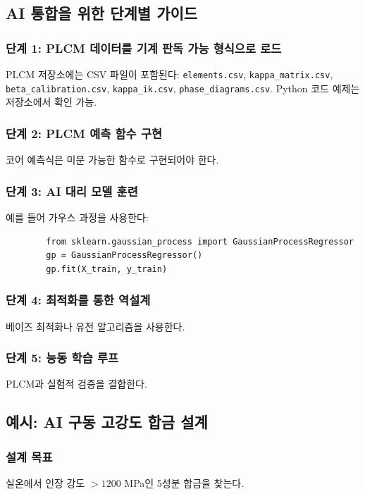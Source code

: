 \documentclass[12pt,a4paper]{article}
\begin{document}
	\subsection{AI 통합을 위한 단계별 가이드}
	
	\subsubsection{단계 1: PLCM 데이터를 기계 판독 가능 형식으로 로드}
	PLCM 저장소에는 CSV 파일이 포함된다: \texttt{elements.csv}, \texttt{kappa\_matrix.csv}, \texttt{beta\_calibration.csv}, \texttt{kappa\_ik.csv}, \texttt{phase\_diagrams.csv}. Python 코드 예제는 저장소에서 확인 가능.
	
	\subsubsection{단계 2: PLCM 예측 함수 구현}
	코어 예측식은 미분 가능한 함수로 구현되어야 한다.
	
	\subsubsection{단계 3: AI 대리 모델 훈련}
	예를 들어 가우스 과정을 사용한다:
	\begin{verbatim}
		from sklearn.gaussian_process import GaussianProcessRegressor
		gp = GaussianProcessRegressor()
		gp.fit(X_train, y_train)
	\end{verbatim}
	
	\subsubsection{단계 4: 최적화를 통한 역설계}
	베이즈 최적화나 유전 알고리즘을 사용한다.
	
	\subsubsection{단계 5: 능동 학습 루프}
	PLCM과 실험적 검증을 결합한다.
	
	\subsection{예시: AI 구동 고강도 합금 설계}
	
	\subsubsection{설계 목표}
	실온에서 인장 강도 \(> 1200\) MPa인 5성분 합금을 찾는다.
	
\end{document}
